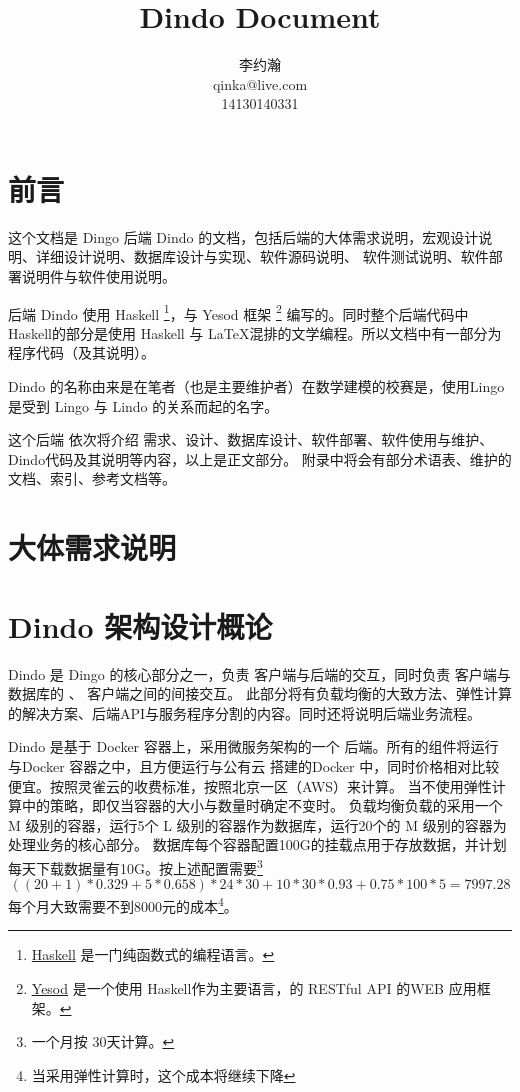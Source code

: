 \documentclass{dingo}
\title{Dindo Document}
\author{李约瀚\\qinka@live.com\\14130140331}
\begin{document}
	\makecover
    \section*{前言}
    这个文档是 Dingo 后端 Dindo 的文档，包括后端的大体需求说明，宏观设计说明、详细设计说明、数据库设计与实现、软件源码说明、
    软件测试说明、软件部署说明件与软件使用说明。

    后端 Dindo 使用 Haskell \footnote{\href{https://www.haskell.org}{Haskell} 是一门纯函数式的编程语言。}，与 Yesod 框架
    \footnote{\href{http://www.yesodweb.com}{Yesod} 是一个使用 Haskell作为主要语言，的 RESTful API 的WEB 应用框架。}
    编写的。同时整个后端代码中 Haskell的部分是使用 Haskell 与 \LaTeX 混排的文学编程。所以文档中有一部分为程序代码（及其说明）。

    Dindo 的名称由来是在笔者（也是主要维护者）在数学建模的校赛是，使用Lingo 是受到 Lingo 与 Lindo 的关系而起的名字。

    这个后端 依次将介绍 需求、设计、数据库设计、软件部署、软件使用与维护、Dindo代码及其说明等内容，以上是正文部分。
    附录中将会有部分术语表、维护的文档、索引、参考文档等。

    \newpage
	\makecontent
		\section{大体需求说明}
    \section{Dindo 架构设计概论}
    Dindo 是 Dingo 的核心部分之一，负责 客户端与后端的交互，同时负责 客户端与数据库的 、 客户端之间的间接交互。
    此部分将有负载均衡的大致方法、弹性计算的解决方案、后端API与服务程序分割的内容。同时还将说明后端业务流程。

    Dindo 是基于 Docker 容器上，采用微服务架构的一个 后端。所有的组件将运行与Docker 容器之中，且方便运行与公有云
    搭建的Docker 中，同时价格相对比较便宜。按照灵雀云的收费标准\cite{alauda:price}，按照北京一区（AWS）来计算。
		当不使用弹性计算中的策略，即仅当容器的大小与数量时确定不变时。
    负载均衡负载的采用一个 M 级别的容器，运行5个 L 级别的容器作为数据库，运行20个的 M 级别的容器为处理业务的核心部分。
    数据库每个容器配置100G的挂载点用于存放数据，并计划每天下载数据量有10G。按上述配置需要\footnote{一个月按 30天计算。}
    $$((20+1)*0.329+5*0.658)*24*30+10*30*0.93+0.75*100*5=7997.28$$
    每个月大致需要不到8000元的成本\footnote{当采用弹性计算时，这个成本将继续下降}。
\end{document}
